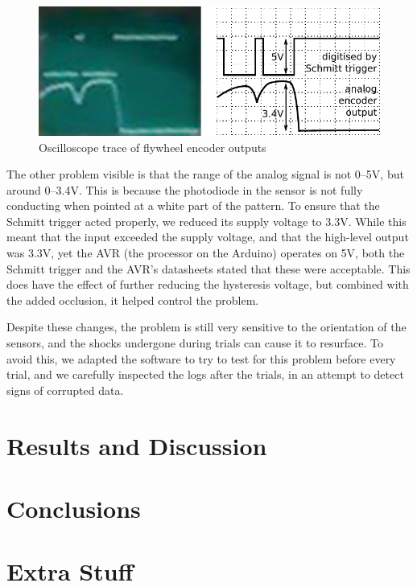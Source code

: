 \documentclass{IIBproject}
\begin{document}
\begin{figure}[htpb]
  \begin{center}
    \includegraphics[width=13cm]{scope_trace.pdf}
    \end{center}
    \caption{Oscilloscope trace of flywheel encoder outputs}
    \label{fig:scope_trace}
    \end{figure}

The other problem visible is that the range of the analog signal is not 0--5V,
but around 0--3.4V. This is because the photodiode in the sensor is not fully
conducting when pointed at a white part of the pattern. To ensure that the
Schmitt trigger acted properly, we reduced its supply voltage to 3.3V. While
this meant that the input exceeded the supply voltage, and that the high-level
output was 3.3V, yet the AVR (the processor on the Arduino) operates on 5V,
both the Schmitt trigger \cite{ref:4093} and the AVR's \cite{ref:atmega}
datasheets stated that these were acceptable. This does have the effect of
further reducing the hysteresis voltage, but combined with the added
occlusion, it helped control the problem.

Despite these changes, the problem is still very sensitive to the orientation
of the sensors, and the shocks undergone during trials can cause it to
resurface. To avoid this, we adapted the software to try to test for this
problem before every trial, and we carefully inspected the logs after the
trials, in an attempt to detect signs of corrupted data.

\section{Results and Discussion}

\section{Conclusions}




\pagebreak
\appendix

\section{Extra Stuff}
\end{document}
